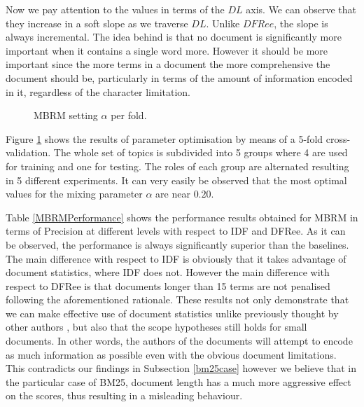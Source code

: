 Now we pay attention to the values in terms of the $DL$ axis. We can observe that they increase in a soft slope as we traverse $DL$. Unlike $DFRee$, the slope is always incremental. The idea behind is that no document is significantly more important when it contains a single word more. However it should be more important since the more terms in a document the more comprehensive the document should be, particularly in terms of the amount of information encoded in it, regardless of the character limitation.


\begin{figure}
	\centering
	\caption{MBRM setting $\alpha$ per fold.}
	
	\label{microblogRM-param}
\end{figure} 

Figure \ref{microblogRM-param} shows the results of parameter optimisation by means of a 5-fold cross-validation. The whole set of topics is subdivided into 5 groups where 4 are used for training and one for testing. The roles of each group are alternated resulting in 5 different experiments. It can very easily be observed that the most optimal values for the mixing parameter $\alpha$ are near $0.20$.


Table \ref{MBRMPerformance} shows the performance results obtained for MBRM in terms of Precision at different levels with respect to IDF and DFRee. As it can be observed, the performance is always significantly superior than the baselines. The main difference with respect to IDF is obviously that it takes advantage of document statistics, where IDF does not. However the main difference with respect to DFRee is that documents longer than 15 terms are not penalised following the aforementioned rationale. These results not only demonstrate that we can make effective use of document statistics unlike previously thought by other authors \cite{naveed2011searching}, but also that the scope hypotheses still holds for small documents. In other words, the authors of the documents will attempt to encode as much information as possible even with the obvious document limitations. This contradicts our findings in Subsection \ref{bm25case} however we believe that in the particular case of BM25, document length has a much more aggressive effect on the scores, thus resulting in a misleading behaviour.

